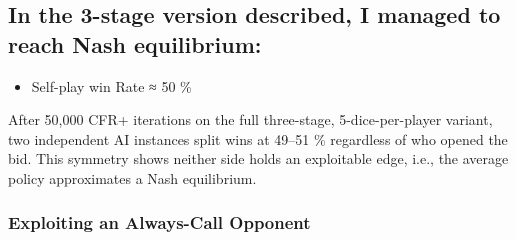 \documentclass[
]{article}
\begin{document}
\subsection*{In the 3-stage version described, I managed to reach Nash
equilibrium:}\label{in-the-3-stage-version-described-i-managed-to-reach-nash-equilibrium}

\begin{itemize}
\item
  Self-play win Rate ≈ 50 \%
\end{itemize}

After 50,000 CFR+ iterations on the full three-stage, 5-dice-per-player
variant, two independent AI instances split wins at 49--51 \% regardless
of who opened the bid. This symmetry shows neither side holds an
exploitable edge, i.e., the average policy approximates a Nash
equilibrium.

\subsubsection*{\texorpdfstring{\textbf{Exploiting an Always-Call
Opponent}}{Exploiting an Always-Call Opponent}}\label{exploiting-an-always-call-opponent}
\end{document}
